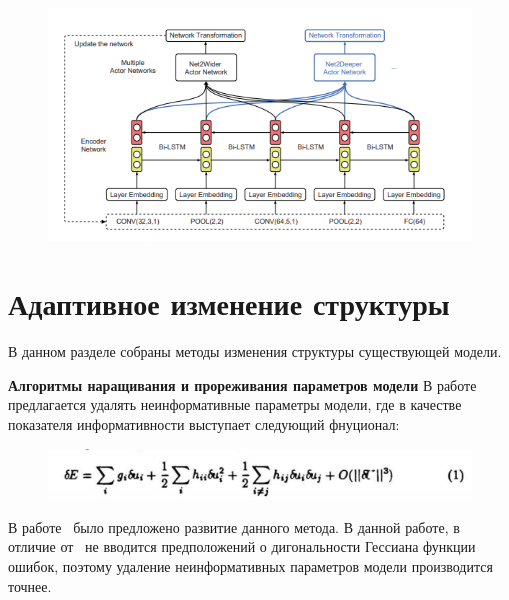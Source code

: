 \begin{figure}[H]
\includegraphics[width=\textwidth]{./arch_review_figs/deep2net.png}
\end{figure}



\section{Адаптивное изменение структуры}
В данном разделе собраны методы изменения структуры существующей модели. 

\textbf{Алгоритмы наращивания и прореживания параметров модели}
В работе~\cite{obd} предлагается удалять неинформативные параметры модели, где в качестве показателя информативности выступает следующий фнуционал: 
\begin{figure}[H]
\includegraphics[width=\textwidth]{./arch_review_figs/obd.png}
\end{figure}
В работе~\cite{obs} было предложено развитие данного метода. В данной работе, в отличие от~\cite{obd} не вводится предположений о дигональности Гессиана функции ошибок, поэтому удаление неинформативных параметров модели производится точнее.

